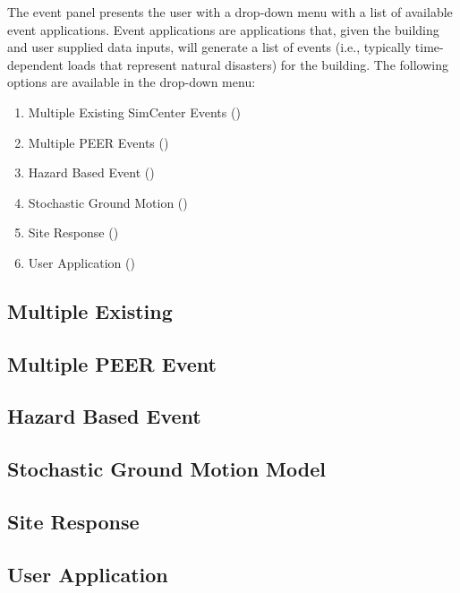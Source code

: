 The event panel presents the user with a drop-down menu with a list of
available event applications. Event applications are applications
that, given the building and user supplied data inputs, will generate
a list of events (i.e., typically time-dependent loads that represent natural disasters) for the building. The following options
are available in the drop-down menu:

\begin{enumerate}
\item Multiple Existing SimCenter Events ()
\item Multiple PEER Events ()
\item Hazard Based Event ()
\item Stochastic Ground Motion ()
\item Site Response ()
\item User Application ()
\end{enumerate}

\subsection{Multiple Existing}
\label{subsec:multiple_existing}


\subsection{Multiple PEER Event}
\label{subsec:multiple_peer}


\subsection{Hazard Based Event}
\label{subsec:hazard_based}


\subsection{Stochastic Ground Motion Model}
\label{subsec:stochastic_motions}


\subsection{Site Response}
\label{subsec:site_response}


\subsection{User Application}
\label{subsec:user_event}

